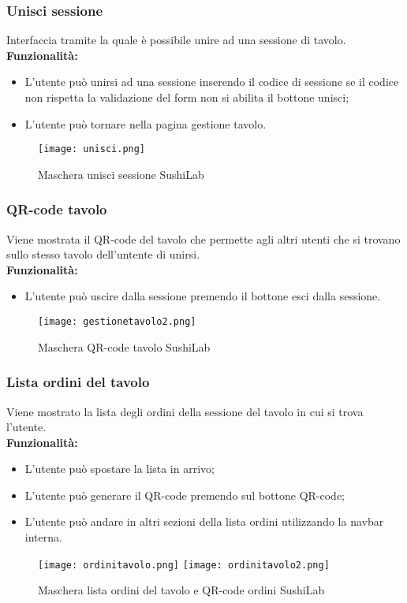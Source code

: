 \subsubsection{Unisci sessione}
Interfaccia tramite la quale è possibile unire ad una sessione di tavolo.\\
\textbf{Funzionalità:}
\begin{itemize}
    \item L'utente può  unirsi ad una sessione inserendo il codice di sessione se il codice non rispetta la validazione del form non si abilita il bottone unisci;
    \item L'utente può tornare nella pagina gestione tavolo.
\end{itemize}
\begin{figure}[H]
    \centering
    \texttt{[image: unisci.png]}
    \caption{Maschera unisci sessione SushiLab}
\end{figure}
\pagebreak

\subsubsection{QR-code tavolo}
Viene mostrata il QR-code del tavolo che permette agli altri utenti che si trovano sullo stesso tavolo dell'untente di unirsi.\\
\textbf{Funzionalità:}
\begin{itemize}
    \item L'utente può uscire dalla sessione premendo il bottone esci dalla sessione.
\end{itemize}
\begin{figure}[H]
    \centering
    \texttt{[image: gestionetavolo2.png]}
    \caption{Maschera QR-code tavolo SushiLab}
\end{figure}
\pagebreak

\subsubsection{Lista ordini del tavolo}
Viene mostrato la lista degli ordini della sessione del tavolo in cui si trova l'utente.\\
\textbf{Funzionalità:}
\begin{itemize}
    \item L'utente può spostare la lista in arrivo;
    \item L'utente può generare il QR-code premendo sul bottone QR-code;
    \item L'utente può andare in altri sezioni della lista ordini utilizzando la navbar interna.
\end{itemize}
\begin{figure}[H]
    \centering
    \texttt{[image: ordinitavolo.png]}
    \texttt{[image: ordinitavolo2.png]}
    \caption{Maschera lista ordini del tavolo e QR-code ordini SushiLab}
\end{figure}
\pagebreak

